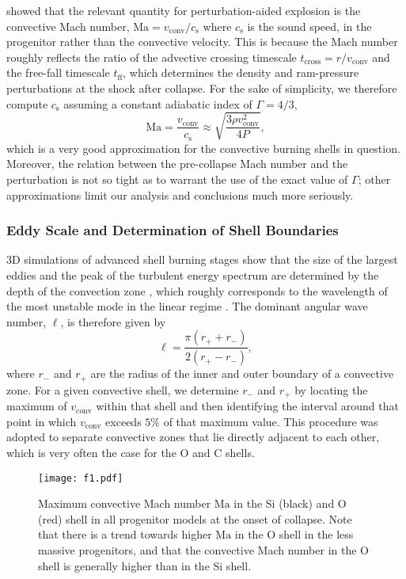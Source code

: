 \documentclass[useAMS,usenatbib]{mnras}
\begin{document}
\citet{mueller_15a} showed that
the relevant quantity for perturbation-aided explosion
is the convective Mach number, $\mathrm{Ma}=v_\mathrm{conv}/c_\mathrm{s}$
where $c_\mathrm{s}$ is the sound speed, in the progenitor
rather than the convective velocity. 
This is because the Mach number roughly reflects
the ratio of the advective crossing timescale
$t_\mathrm{cross}=r/v_\mathrm{conv}$ 
and the free-fall timescale $t_\mathrm{ff}$, which determines
the density and ram-pressure perturbations at the shock after collapse.
For the sake of simplicity,
we therefore compute $c_\mathrm{s}$ assuming a constant adiabatic
index of $\Gamma=4/3$,
\begin{equation}
\label{eq:maconv}
\mathrm{Ma}=\frac{v_\mathrm{conv}}{c_\mathrm{s}}
\approx \sqrt{\frac{3 \rho v_\mathrm{conv}^2}{4 P}},
\end{equation}
which is a very good approximation for the convective burning shells
in question. Moreover, the relation between the pre-collapse Mach
number and the perturbation is not so tight as to warrant
the use of the exact value of $\Gamma$; other approximations
limit our analysis and conclusions much more seriously.

\subsubsection{Eddy Scale and Determination of Shell Boundaries}
3D simulations of advanced shell burning stages show that the size of
the largest eddies and the peak of the turbulent
energy spectrum are determined by the depth of the convection zone
\citep{arnett_09,mueller_16c}, which roughly corresponds
to the wavelength of the most unstable mode in the linear regime
 \citep{chandrasekhar_61,foglizzo_06}. The dominant
angular wave number, $\ell$, is therefore given by
\begin{equation}
\label{eq:lconv}
\ell= \frac{\pi (r_+ + r_-)}{2 (r_+ - r_-)},
\end{equation}
where $r_-$ and $r_+$ are the radius of the inner and outer boundary
of a convective zone. For a given convective shell, we determine $r_-$
and $r_+$ by locating the maximum of $v_\mathrm{conv}$ within
that shell and then identifying the interval around that
point in which $v_\mathrm{conv}$ exceeds $5\%$ of that maximum value.
This procedure was adopted to separate convective zones that lie
directly adjacent to each other, which is very often the 
case for the O and C shells. 

\begin{figure}
\texttt{[image: f1.pdf]}
\caption{Maximum convective Mach number
$\mathrm{Ma}$ in the Si (black)
and O (red) shell in all progenitor models at the onset of collapse.
Note that there is  a trend towards higher
$\mathrm{Ma}$ in the O shell
in the less massive progenitors,
and that the convective Mach number
in the O shell is generally higher
than in the Si shell.
\label{fig:mach}}
\end{figure}
\end{document}
